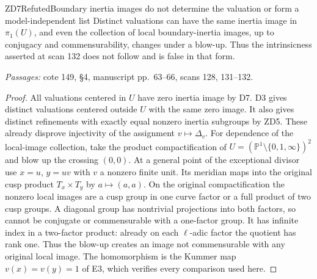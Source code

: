 \begin{result}{ZD7}{Refuted}{Boundary inertia images do not determine the valuation or form a model-independent list}
Distinct valuations can have the same inertia image in $\pi_1(U)$, and even the collection of local boundary-inertia images, up to conjugacy and commensurability, changes under a blow-up. Thus the intrinsicness asserted at scan 132 does not follow and is false in that form.
\par\emph{Passages:} cote 149, \S4, manuscript pp.~63--66, scans 128, 131--132.
\end{result}
\begin{proof}
All valuations centered in $U$ have zero inertia image by D7. D3 gives distinct valuations centered outside $U$ with the same zero image. It also gives distinct refinements with exactly equal nonzero inertia subgroups by ZD5. These already disprove injectivity of the assignment $v\mapsto\Delta_v$.
For dependence of the local-image collection, take the product compactification of $U=(\mathbb P^1\setminus\{0,1,\infty\})^2$ and blow up the crossing $(0,0)$. At a general point of the exceptional divisor use $x=u$, $y=uv$ with $v$ a nonzero finite unit. Its meridian maps into the original cusp product $T_x\times T_y$ by $a\mapsto(a,a)$. On the original compactification the nonzero local images are a cusp group in one curve factor or a full product of two cusp groups. A diagonal group has nontrivial projections into both factors, so cannot be conjugate or commensurable with a one-factor group. It has infinite index in a two-factor product: already on each $\ell$-adic factor the quotient has rank one. Thus the blow-up creates an image not commensurable with any original local image. The homomorphism is the Kummer map $v(x)=v(y)=1$ of E3, which verifies every comparison used here.
\end{proof}

